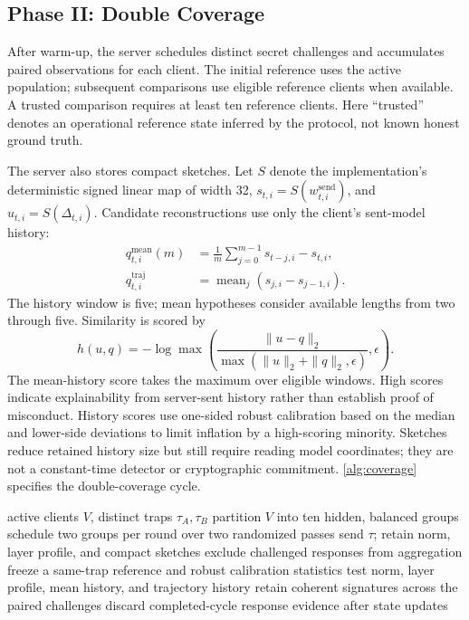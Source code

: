 \documentclass[conference]{IEEEtran}
\begin{document}
\subsection{Phase II: Double Coverage}
After warm-up, the server schedules distinct secret challenges and accumulates paired observations for each client. The initial reference uses the active population; subsequent comparisons use eligible reference clients when available. A trusted comparison requires at least ten reference clients. Here ``trusted'' denotes an operational reference state inferred by the protocol, not known honest ground truth.

The server also stores compact sketches. Let $S$ denote the implementation's deterministic signed linear map of width 32, $s_{t,i}=S(w^{\mathrm{send}}_{t,i})$, and $u_{t,i}=S(\Delta_{t,i})$. Candidate reconstructions use only the client's sent-model history:
\begin{align}
q^{\mathrm{mean}}_{t,i}(m)&=\frac1m\sum_{j=0}^{m-1}s_{t-j,i}-s_{t,i},\\
q^{\mathrm{traj}}_{t,i}&=\operatorname{mean}_j(s_{j,i}-s_{j-1,i}).
\end{align}
The history window is five; mean hypotheses consider available lengths from two through five. Similarity is scored by
\begin{equation}
h(u,q)=-\log\max\left(\frac{\|u-q\|_2}{\max(\|u\|_2+\|q\|_2,\epsilon)},\epsilon\right).
\end{equation}
The mean-history score takes the maximum over eligible windows. High scores indicate explainability from server-sent history rather than establish proof of misconduct. History scores use one-sided robust calibration based on the median and lower-side deviations to limit inflation by a high-scoring minority. Sketches reduce retained history size but still require reading model coordinates; they are not a constant-time detector or cryptographic commitment. \autoref{alg:coverage} specifies the double-coverage cycle.

\begin{algorithm}[t]
\caption{Phase II: double coverage and evidence construction}
\label{alg:coverage}
\begin{algorithmic}[1]
\Require active clients $V$, distinct traps $\tau_A,\tau_B$
\State partition $V$ into ten hidden, balanced groups
\State schedule two groups per round over two randomized passes
   \State send $\tau$; retain norm, layer profile, and compact sketches
   \State exclude challenged responses from aggregation
 \EndFor
 \State freeze a same-trap reference and robust calibration statistics
\EndFor
{}
 \State test norm, layer profile, mean history, and trajectory history
 \State retain coherent signatures across the paired challenges
\EndFor
\State discard completed-cycle response evidence after state updates
\end{algorithmic}
\end{algorithm}
\end{document}
